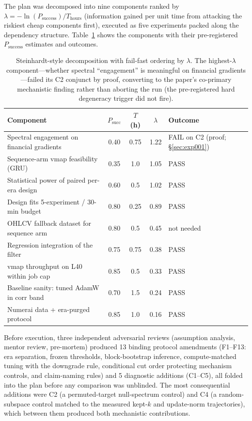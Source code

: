 The plan was decomposed into nine components ranked by
$\lambda = -\ln(P_{\text{success}})/T_{\text{hours}}$ (information gained
per unit time from attacking the riskiest cheap components first), executed
as five experiments packed along the dependency structure.
Table~\ref{tab:lambda} shows the components with their pre-registered
$P_{\text{success}}$ estimates and outcomes.

\begin{table}[t]
\centering
\small
\begin{tabular}{lcccl}
\toprule
Component & $P_{\text{succ}}$ & $T$ (h) & $\lambda$ & Outcome \\
\midrule
Spectral engagement on financial gradients & 0.40 & 0.75 & 1.22 &
  FAIL on C2 (proof; \S\ref{sec:exp001}) \\
Sequence-arm vmap feasibility (GRU) & 0.35 & 1.0 & 1.05 & PASS \\
Statistical power of paired per-era design & 0.60 & 0.5 & 1.02 & PASS \\
Design fits 5-experiment / 30-min budget & 0.80 & 0.25 & 0.89 & PASS \\
OHLCV fallback dataset for sequence arm & 0.80 & 0.5 & 0.45 & not needed \\
Regression integration of the filter & 0.75 & 0.75 & 0.38 & PASS \\
vmap throughput on L40 within job cap & 0.85 & 0.5 & 0.33 & PASS \\
Baseline sanity: tuned AdamW in corr band & 0.70 & 1.5 & 0.24 & PASS \\
Numerai data + era-purged protocol & 0.85 & 1.0 & 0.16 & PASS \\
\bottomrule
\end{tabular}
\caption{Steinhardt-style decomposition with fail-fast ordering by
  $\lambda$. The highest-$\lambda$ component---whether spectral
  ``engagement'' is meaningful on financial gradients---failed its C2
  conjunct by proof, converting to the paper's co-primary mechanistic
  finding rather than aborting the run (the pre-registered hard
  degeneracy trigger did not fire).}
\label{tab:lambda}
\end{table}

Before execution, three independent adversarial reviews (assumption
analysis, mentor review, pre-mortem) produced 13 binding protocol
amendments (F1--F13: era separation, frozen thresholds, block-bootstrap
inference, compute-matched tuning with the downgrade rule, conditional cut
order protecting mechanism controls, and claim-naming rules) and 5
diagnostic additions (C1--C5), all folded into the plan before any
comparison was unblinded. The most consequential additions were C2 (a
permuted-target null-spectrum control) and C4 (a random-subspace control
matched to the measured kept-$k$ and update-norm trajectories), which
between them produced both mechanistic contributions.

